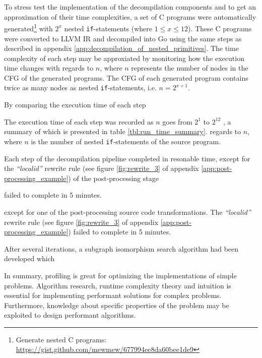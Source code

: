 

To stress test the implementation of the decompilation components and to get an approximation of their time complexities, a set of C programs were automatically generated\footnote{Generate nested C programs: \url{https://gist.github.com/mewmew/677994ee8da60bee1de9}} with $ 2^x $ nested \texttt{if}-statements (where $ 1 \le x \le 12 $). These C programs were converted to LLVM IR and decompiled into Go using the same steps as described in appendix \ref{app:decompilation_of_nested_primitives}. The time complexity of each step may be approxiated by monitoring how the execution time changes with regards to $ n $, where $ n $ represents the number of nodes in the CFG of the generated programs. The CFG of each generated program contains twice as many nodes as nested \texttt{if}-statements, i.e. $ n = 2^{x+1} $.

By comparing the execution time of each step

The execution time of each step  was recorded as $ n $ goes from $ 2 ^ 1 $ to $ 2 ^ 12 $ , a summary of which is presented in table \ref{tbl:run_time_summary}.
 regards to $ n $, where $ n $ is the number of nested \texttt{if}-statements of the source program.

Each step of the decompilation pipeline completed in resonable time, except for the \textit{``localid''} rewrite rule (see figure \ref{fig:rewrite_3} of appendix \ref{app:post-processing_example}) of the post-processing stage

failed to complete in 5 minutes.

 except for one of the post-processing source code transformations. The \textit{``localid''} rewrite rule (see figure \ref{fig:rewrite_3} of appendix \ref{app:post-processing_example}) failed to complete in 5 minutes.

After several iterations, a subgraph isomorphism search algorithm had been developed which


In summary, profiling is great for optimizing the implementations of simple problems. Algorithm research, runtime complexity theory and intuition is essential for implementing performant solutions for complex problems. Furthermore, knowledge about specific properties of the problem may be exploited to design performant algorithms.




